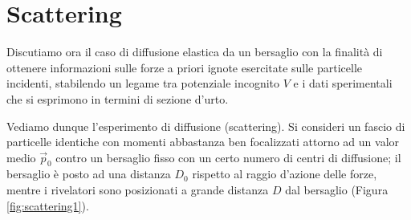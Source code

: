 \documentclass[../../FisicaTeorica.tex]{subfiles}
\begin{document}
\section{Scattering}

Discutiamo ora il caso di diffusione elastica da un bersaglio con la
finalit{\`a} di ottenere informazioni sulle forze a priori ignote esercitate
sulle particelle incidenti, stabilendo un legame tra potenziale incognito $V$ e i dati sperimentali che si esprimono in termini di sezione
d'urto.

Vediamo dunque l'esperimento di diffusione (scattering). Si consideri un
fascio di particelle identiche con momenti abbastanza ben focalizzati attorno
ad un valor medio $\vec{p}_0$ contro un bersaglio fisso con un certo numero di
centri di diffusione; il bersaglio {\`e} posto ad una distanza $D_0$ rispetto
al raggio d'azione delle forze, mentre i rivelatori sono posizionati a grande
distanza $D$ dal bersaglio (Figura \ref{fig:scattering1}).
\end{document}
